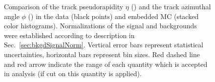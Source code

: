 \begin{figure}[ht!]
{  \begin{subfigure}[b]{\linewidth}{
                }
  \end{subfigure}
}%
\caption[Comparison of distribution of track $\eta$ and $\phi$ in the data and embedded MC.]
{Comparison of the track pseudorapidity $\eta$ () and the track azimuthal angle $\phi$ () in the data (black points) and embedded MC (stacked color histograms). Normalizations of the signal and backgrounds were established according to description in Sec.~\ref{sec:bkgdSignalNorm}. Vertical error bars represent statistical uncertainties, horizontal bars represent bin sizes. Red dashed line and red arrow indicate the range of each quantity which is accepted in analysis (if cut on this quantity is applied).}\label{fig:TrackEtaPhi}
\end{figure}









